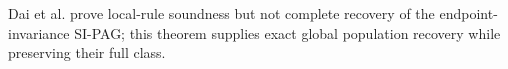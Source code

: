 Dai et al. prove local-rule soundness but not complete recovery of the endpoint-invariance SI-PAG; this theorem supplies exact global population recovery while preserving their full class.